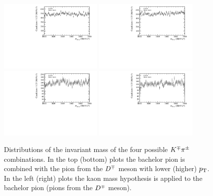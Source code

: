 \begin{figure}[t]
	\begin{center}
		\includegraphics[width=0.45\textwidth]{02Selection/figs/D0Hypo1.pdf}
		\includegraphics[width=0.45\textwidth]{02Selection/figs/D0Hypo2.pdf}\\
		\includegraphics[width=0.45\textwidth]{02Selection/figs/D0Hypo3.pdf}
		\includegraphics[width=0.45\textwidth]{02Selection/figs/D0Hypo4.pdf}
	\end{center}
        \vspace{-2mm}
	\caption{Distributions of the invariant mass of the four possible $K^\mp\pi^\pm$
	combinations. In the top (bottom) plots the bachelor pion is combined with the pion from the $D^\mp$ meson with lower (higher) $\mbox{$p_{\rm T}$}$. 
	In the left (right) plots the
	kaon mass hypothesis is applied to the bachelor pion (pions from the $D^\mp$ meson).}
	\label{fig:D0veto}
\end{figure}


